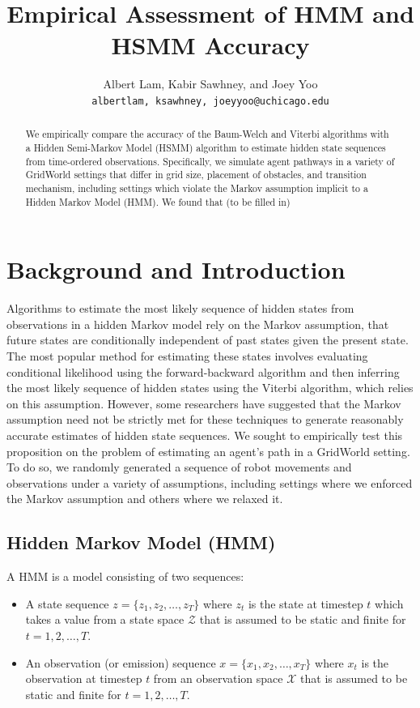 \documentclass{article}
\title{Empirical Assessment of HMM and HSMM Accuracy}
\author{%
  Albert Lam, Kabir Sawhney, and Joey Yoo \\
  \texttt{albertlam, ksawhney, joeyyoo@uchicago.edu} \\
}
\begin{document}

\maketitle

\begin{abstract}
We empirically compare the accuracy of the Baum-Welch and Viterbi algorithms with a Hidden Semi-Markov Model (HSMM) algorithm to estimate hidden state sequences from time-ordered observations. Specifically, we simulate agent pathways in a variety of GridWorld settings that differ in grid size, placement of obstacles, and transition mechanism, including settings which violate the Markov assumption implicit to a Hidden Markov Model (HMM). We found that (to be filled in)
\end{abstract}

\section{Background and Introduction}

Algorithms to estimate the most likely sequence of hidden states from observations in a hidden Markov model rely on the Markov assumption, that future states are conditionally independent of past states given the present state. The most popular method for estimating these states involves evaluating conditional likelihood using the forward-backward algorithm and then inferring the most likely sequence of hidden states using the Viterbi algorithm, which relies on this assumption. However, some researchers have suggested that the Markov assumption need not be strictly met for these techniques to generate reasonably accurate estimates of hidden state sequences. We sought to empirically test this proposition on the problem of estimating an agent's path in a GridWorld setting. To do so, we randomly generated a sequence of robot movements and observations under a variety of assumptions, including settings where we enforced the Markov assumption and others where we relaxed it.

\subsection{Hidden Markov Model (HMM)}
A HMM is a model consisting of two sequences:
\begin{itemize}
  \item A state sequence $z = \{z_1, z_2, \dots, z_T\}$ where $z_t$ is the state at timestep $t$ which takes a value from a state space $\mathcal{Z}$ that is assumed to be static and finite for $t = 1, 2, \dots, T$.
  \item An observation (or emission) sequence $x = \{x_1, x_2, \dots, x_T\}$ where $x_t$ is the observation at timestep $t$ from an observation space $\mathcal{X}$ that is assumed to be static and finite for $t = 1, 2, \dots, T$.
\end{itemize}
\end{document}
